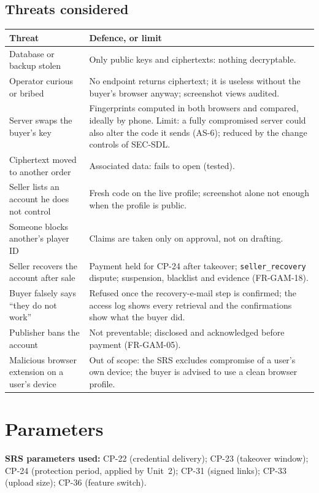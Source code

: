 \documentclass[11pt,a4paper]{article}
\newenvironment{dtable}[1]{\small\begin{longtable}{#1}}{\end{longtable}}
\begin{document}
\subsection{Threats considered}
\begin{dtable}{@{}>{\raggedright\arraybackslash}p{4.6cm}>{\raggedright\arraybackslash}p{10.6cm}@{}}
\toprule
\textbf{Threat} & \textbf{Defence, or limit} \\ \midrule \endhead
Database or backup stolen & Only public keys and ciphertexts: nothing decryptable. \\
Operator curious or bribed & No endpoint returns ciphertext; it is useless without the buyer's browser anyway; screenshot views audited. \\
Server swaps the buyer's key & Fingerprints computed in both browsers and compared, ideally by phone. Limit: a fully compromised server could also alter the code it sends (AS-6); reduced by the change controls of SEC-SDL. \\
Ciphertext moved to another order & Associated data: fails to open (tested). \\
Seller lists an account he does not control & Fresh code on the live profile; screenshot alone not enough when the profile is public. \\
Someone blocks another's player ID & Claims are taken only on approval, not on drafting. \\
Seller recovers the account after sale & Payment held for CP-24 after takeover; \texttt{seller\_recovery} dispute; suspension, blacklist and evidence (FR-GAM-18). \\
Buyer falsely says ``they do not work'' & Refused once the recovery-e-mail step is confirmed; the access log shows every retrieval and the confirmations show what the buyer did. \\
Publisher bans the account & Not preventable; disclosed and acknowledged before payment (FR-GAM-05). \\
Malicious browser extension on a user's device & Out of scope: the SRS excludes compromise of a user's own device; the buyer is advised to use a clean browser profile. \\
\bottomrule
\end{dtable}

\section{Parameters}
\textbf{SRS parameters used:} CP-22 (credential delivery); CP-23 (takeover window); CP-24 (protection period, applied by Unit~2); CP-31 (signed links); CP-33 (upload size); CP-36 (feature switch).
\end{document}
